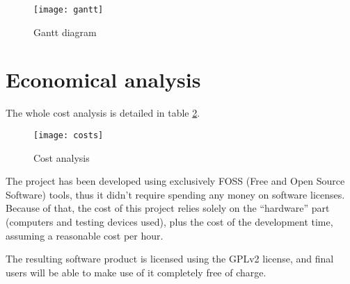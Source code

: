 \begin{figure}[tp]
\centering
\texttt{[image: gantt]}
\caption{Gantt diagram}
\label{fig:gantt_diagram}
\end{figure}


\section{Economical analysis}

The whole cost analysis is detailed in table \ref{fig:cost_analysis}.
\begin{figure}[htb]
\centering
\texttt{[image: costs]}
\caption{Cost analysis}
\label{fig:cost_analysis}
\end{figure}

The project has been developed using exclusively FOSS (Free and Open Source Software) tools, thus it didn't require spending any money on software licenses. Because of that, the cost of this project relies solely on the ``hardware'' part (computers and testing devices used), plus the cost of the development time, assuming a reasonable cost per hour.

The resulting software product is licensed using the GPLv2 license, and final users will be able to make use of it completely free of charge.
